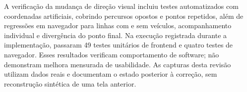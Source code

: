 A verificação da mudança de direção visual incluiu testes automatizados com coordenadas artificiais, cobrindo percursos opostos e pontos repetidos, além de regressões em navegador para linhas com e sem veículos, acompanhamento individual e divergência do ponto final. Na execução registrada durante a implementação, passaram 49 testes unitários de frontend e quatro testes de navegador. Esses resultados verificam comportamento de software; não demonstram melhora mensurada de usabilidade. As capturas desta revisão utilizam dados reais e documentam o estado posterior à correção, sem reconstrução sintética de uma tela anterior.

